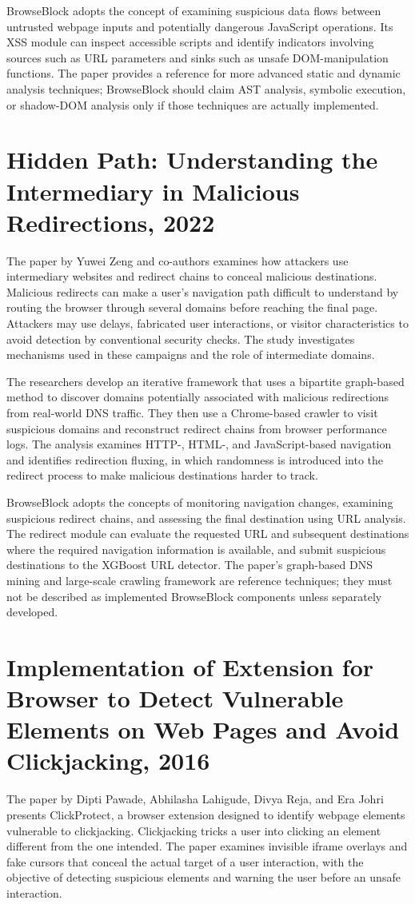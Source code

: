 BrowseBlock adopts the concept of examining suspicious data flows between
untrusted webpage inputs and potentially dangerous JavaScript operations. Its XSS
module can inspect accessible scripts and identify indicators involving sources
such as URL parameters and sinks such as unsafe DOM-manipulation functions. The
paper provides a reference for more advanced static and dynamic analysis
techniques; BrowseBlock should claim AST analysis, symbolic execution, or
shadow-DOM analysis only if those techniques are actually implemented.

\clearpage
\section{Hidden Path: Understanding the Intermediary in Malicious Redirections, 2022}
The paper by Yuwei Zeng and co-authors examines how attackers use intermediary
websites and redirect chains to conceal malicious destinations. Malicious redirects
can make a user's navigation path difficult to understand by routing the browser
through several domains before reaching the final page. Attackers may use delays,
fabricated user interactions, or visitor characteristics to avoid detection by
conventional security checks. The study investigates mechanisms used in these
campaigns and the role of intermediate domains.

The researchers develop an iterative framework that uses a bipartite graph-based
method to discover domains potentially associated with malicious redirections from
real-world DNS traffic. They then use a Chrome-based crawler to visit suspicious
domains and reconstruct redirect chains from browser performance logs. The analysis
examines HTTP-, HTML-, and JavaScript-based navigation and identifies redirection
fluxing, in which randomness is introduced into the redirect process to make
malicious destinations harder to track.

BrowseBlock adopts the concepts of monitoring navigation changes, examining
suspicious redirect chains, and assessing the final destination using URL analysis.
The redirect module can evaluate the requested URL and subsequent destinations
where the required navigation information is available, and submit suspicious
destinations to the XGBoost URL detector. The paper's graph-based DNS mining and
large-scale crawling framework are reference techniques; they must not be
described as implemented BrowseBlock components unless separately developed.

\clearpage
\section{Implementation of Extension for Browser to Detect Vulnerable Elements on Web Pages and Avoid Clickjacking, 2016}
The paper by Dipti Pawade, Abhilasha Lahigude, Divya Reja, and Era Johri presents
ClickProtect, a browser extension designed to identify webpage elements vulnerable
to clickjacking. Clickjacking tricks a user into clicking an element different from
the one intended. The paper examines invisible iframe overlays and fake cursors
that conceal the actual target of a user interaction, with the objective of
detecting suspicious elements and warning the user before an unsafe interaction.

